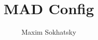 
\renewcommand{\images}{http://synrc.com/apps/mad/doc/images}

\title{MAD Config}
\author{Maxim Sokhatsky}



